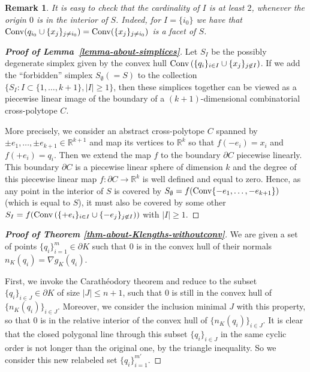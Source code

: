 \documentclass[11pt]{article}
\def\conv{{\rm Conv}}
\def\RR{\mathbb{R}}
\newtheorem{remark}[lemma]{Remark}
\begin{document}
{\begin{remark} {\rm 
It is easy to check that the cardinality of $I$ is at least $2$, whenever the origin $0$ is in the interior of $S$. Indeed, 
for $I=\{i_0\}$ we have that ${\rm Conv}(q_{i_0} \cup \{x_j\}_{j\neq i_0}) = {\rm Conv}( \{x_j\}_{j\neq i_0}) $ is a facet of $S$. 
}
\end{remark}

\begin{proof}[{\bf Proof of Lemma~\ref{lemma-about-simplices}}]
Let $S_I$ be the possibly degenerate simplex given by the convex hull $\mathop{\rm Conv}\left(\{q_i\}_{i\in I}\cup \{x_j\}_{j\not\in I}\right)$. If we add the ``forbidden'' simplex $S_{\emptyset } (=S)$ to the collection $\{S_I: {I\subset \{1,\ldots,k+1\}, |I|\ge 1}\}$, then these simplices together can be viewed as a piecewise linear image of the boundary of a $(k+1)$-dimensional combinatorial cross-polytope $C$. 

More precisely, we consider an abstract cross-polytope $C$ spanned by $\pm e_1, \ldots, \pm e_{k+1}\in \RR^{k+1}$ and map its vertices to $\RR^k$ so that $f(-e_i) = x_i$ and $f(+e_i) = q_i$. Then we extend the map $f$ to the boundary $\partial C$ piecewise linearly. This boundary $\partial C$ is a piecewise linear sphere of dimension $k$ and the degree of this piecewise linear map $f : \partial C\to \RR^k$ is well defined and equal to zero. Hence, as any point in the interior of $S$ is covered by $S_{\emptyset}=f(\conv\{-e_1,\ldots, -e_{k+1}\})$ (which is equal to $S$), it must also be covered by some other $S_I=f(\conv\left(\{+e_i\}_{i\in I}\cup \{-e_j\}_{j\not\in I}\right))$ with $|I| \ge 1$.
\end{proof}

\begin{proof}[{\bf Proof of Theorem \ref{thm-about-Klengths-withoutconv}}]
We are given a set of points $\{q_i\}_{i=1}^m \in \partial K$ such that $0$ is in the convex hull of their normals $n_K(q_i) = \nabla g_K(q_i)$. 

First, we invoke the Carath\'eodory theorem and reduce to the subset $\{q_i\}_{i\in J} \in \partial K$ of size $|J|\le n+1$, such that $0$ is still in the convex hull of $\{n_K(q_i)\}_{i\in J}$. Moreover, we consider the inclusion minimal $J$ with this property, so that $0$ is in the relative interior of the convex hull of $\{n_K(q_i)\}_{i\in J}$. It is clear that the closed polygonal line through this subset  $\{q_i\}_{i\in J}$ in the same cyclic order is not longer than the original one, by the triangle inequality. So we consider this new relabeled set $\{q_i\}_{i=1}^{m'}$.


\end{proof}}
\end{document}
